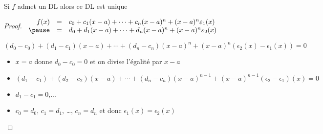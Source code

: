 \begin{frame}


\begin{proposition}
Si $f$ admet un DL alors ce DL est unique
\end{proposition}

\pause

\begin{proof}
{\center
$\begin{array}{rcl}
f(x) 
& = & c_0+c_1(x-a)+\cdots+c_n(x-a)^n+(x-a)^n\epsilon_1(x) \\
\pause
& = & d_0+d_1(x-a)+\cdots+d_n(x-a)^n+(x-a)^n\epsilon_2(x)   
\end{array}
$

\pause
\medskip

$(d_0-c_0)+(d_1-c_1)(x-a)+\cdots+(d_n-c_n)(x-a)^n+(x-a)^n(\epsilon_2(x)-\epsilon_1(x))=0$
}

\pause
\begin{itemize}
  \item $x=a$ \pause donne $d_0-c_0=0$ \pause et on divise l'égalité par $x-a$
\pause
  \item $(d_1-c_1)+(d_2-c_2)(x-a)+\cdots+(d_n-c_n)(x-a)^{n-1}+(x-a)^{n-1}(\epsilon_2-\epsilon_1)(x)=0$
\pause
  \item $d_1-c_1=0$,...
\pause
  \item $c_0=d_0$, $c_1=d_1$, \ldots, $c_n=d_n$ \pause et donc $\epsilon_1(x)=\epsilon_2(x)$
\end{itemize}

\end{proof}
\end{frame}



